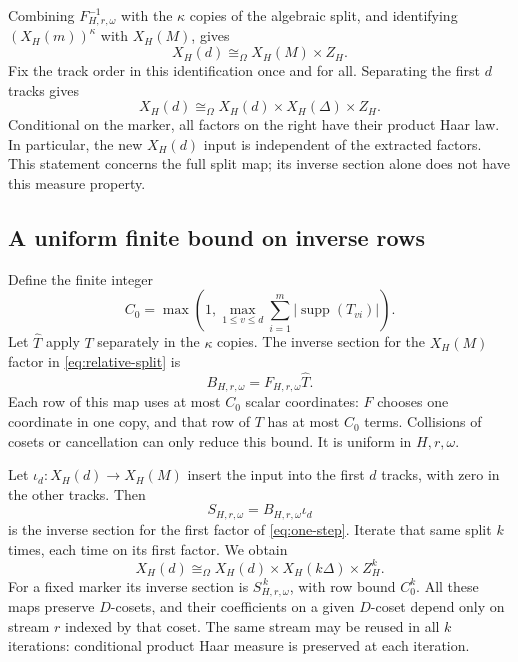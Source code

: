\documentclass[11pt,a4paper]{article}
\numberwithin{equation}{section}
\DeclareMathOperator{\supp}{supp}
\newcommand{\reliso}{\mathrel{\cong_{\Omega}}}
\begin{document}
Combining $F_{H,r,\omega}^{-1}$ with the $\kappa$ copies of the algebraic
split, and identifying $(X_H(m))^\kappa$ with $X_H(M)$, gives
\begin{equation}\label{eq:relative-split}
 X_H(d)\reliso X_H(M)\times Z_H.
\end{equation}
Fix the track order in this identification once and for all. Separating
the first $d$ tracks gives
\begin{equation}\label{eq:one-step}
 X_H(d)\reliso X_H(d)\times X_H(\Delta)\times Z_H.
\end{equation}
Conditional on the marker, all factors on the right have their product
Haar law. In particular, the new $X_H(d)$ input is independent of the
extracted factors. This statement concerns the full split map; its
inverse section alone does not have this measure property.

\subsection{A uniform finite bound on inverse rows}

Define the finite integer
\begin{equation}\label{eq:C}
 C_0=\max\left(1,\max_{1\leq v\leq d}
                    \sum_{i=1}^m|\supp(T_{vi})|\right).
\end{equation}
Let $\widehat T$ apply $T$ separately in the $\kappa$ copies. The inverse
section for the $X_H(M)$ factor in \eqref{eq:relative-split} is
\[
 B_{H,r,\omega}=F_{H,r,\omega}\widehat T.
\]
Each row of this map uses at most $C_0$ scalar coordinates: $F$ chooses
one coordinate in one copy, and that row of $T$ has at most $C_0$ terms.
Collisions of cosets or cancellation can only reduce this bound. It is
uniform in $H,r,\omega$.

Let $\iota_d:X_H(d)\to X_H(M)$ insert the input into the first $d$
tracks, with zero in the other tracks. Then
\begin{equation}\label{eq:S}
 S_{H,r,\omega}=B_{H,r,\omega}\iota_d
\end{equation}
is the inverse section for the first factor of \eqref{eq:one-step}.
Iterate that same split $k$ times, each time on its first factor. We
obtain
\begin{equation}\label{eq:k-split}
 X_H(d)\reliso
 X_H(d)\times X_H(k\Delta)\times Z_H^k.
\end{equation}
For a fixed marker its inverse section is $S_{H,r,\omega}^{\,k}$,
with row bound $C_0^k$. All these maps preserve $D$-cosets, and their
coefficients on a given $D$-coset depend only on stream $r$ indexed
by that coset. The same stream may be reused in all $k$ iterations:
conditional product Haar measure is preserved at each iteration.
\end{document}
